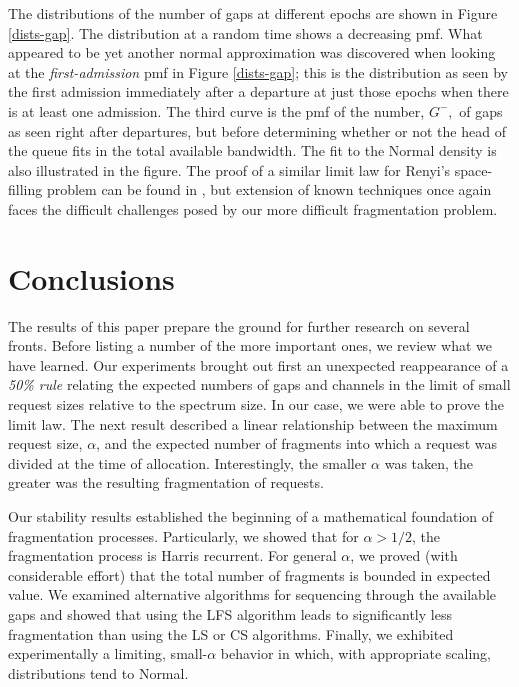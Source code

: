 \documentclass{amsart}
\begin{document}
The distributions of the number of gaps at different epochs are shown
in Figure \ref{dists-gap}.  The distribution at a random time shows
a decreasing pmf. What appeared to be
yet another normal approximation was discovered when looking at the
{\em first-admission} pmf in Figure \ref{dists-gap};  this is the
distribution as seen by the first admission immediately after a
departure at just those epochs when there is at least one admission.
The third curve is the pmf of the number, $G^-,$ of gaps as seen
right after departures, but before determining whether or not the
head of the queue fits in the total available bandwidth. The fit to
the Normal density is also illustrated in the figure. The
proof of a similar limit law for Renyi's space-filling problem can
be found in \cite{DRlongago}, but extension of known techniques once
again faces the difficult challenges posed by our more difficult
fragmentation problem.

\section{Conclusions}\label{sec:conc}
The results of this paper prepare the ground for further research on
several fronts.  Before listing a number of the more important ones,
we review what we have learned.  Our experiments brought out first
an unexpected reappearance of a {\em 50\% rule} relating the
expected numbers of gaps and channels in the limit of small request
sizes relative to the spectrum size.  In our case, we were able to
prove the limit law.   The next result described a linear
relationship between the maximum request size, $\alpha$, and the
expected number of fragments into which a request was divided at the
time  of allocation. Interestingly, the smaller $\alpha$ was taken,
the greater was the resulting fragmentation of requests.

Our stability
results  established the beginning of a mathematical
foundation of fragmentation processes. Particularly, we showed
that for $\alpha > 1/2$, the fragmentation process is Harris
recurrent. For general $\alpha$, we proved (with considerable
effort) that the total number of fragments is bounded in expected
value.  We examined alternative algorithms for sequencing through the available gaps and showed that using the LFS algorithm leads to significantly less fragmentation than using the LS or CS algorithms. Finally, we exhibited experimentally a limiting,
small-$\alpha$ behavior in which, with appropriate scaling,
distributions tend to Normal.
\end{document}
